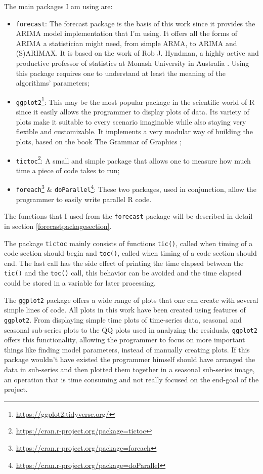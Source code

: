 \documentclass[12pt,a4paper,titlepage]{report}
\begin{document}
The main packages I am using are: 
\begin{itemize}
    \item \texttt{forecast}: The forecast package is the basis of this work since it provides the ARIMA model implementation that I'm using. It offers all the forms of ARIMA a statistician might need, from simple ARMA, to ARIMA and (S)ARIMAX. It is based on the work of Rob J. Hyndman, a highly active and productive professor of statistics at Monash University in Australia \cite{forecastpackagearticle} \cite{forecastpackagemanual}. Using this package requires one to understand at least the meaning of the algorithms' parameters;
    \item \texttt{ggplot2}\footnote{\url{https://ggplot2.tidyverse.org/}}: This may be the most popular package in the scientific world of R since it easily allows the programmer to display plots of data. Its variety of plots make it suitable to every scenario imaginable while also staying very flexible and customizable. It implements a very modular way of building the plots, based on the book The Grammar of Graphics \cite{thegrammarofgraphics};
    \item \texttt{tictoc}\footnote{\url{https://cran.r-project.org/package=tictoc}}: A small and simple package that allows one to measure how much time a piece of code takes to run;
    \item \texttt{foreach}\footnote{\url{https://cran.r-project.org/package=foreach}} \& \texttt{doParallel}\footnote{\url{https://cran.r-project.org/package=doParallel}}: These two packages, used in conjunction, allow the programmer to easily write parallel R code.
\end{itemize}

The functions that I used from the \texttt{forecast} package will be described in detail in section \ref{forecastpackagesection}.

The package \texttt{tictoc} mainly consists of functions \texttt{tic()}, called when timing of a code section should begin and \texttt{toc()}, called when timing of a code section should end. The last call has the side effect of printing the time elapsed between the \texttt{tic()} and the \texttt{toc()} call, this behavior can be avoided and the time elapsed could be stored in a variable for later processing.

The \texttt{ggplot2} package offers a wide range of plots that one can create with several simple lines of code. All plots in this work have been created using features of \texttt{ggplot2}. From displaying simple time plots of time-series data, seasonal and seasonal sub-series plots to the QQ plots used in analyzing the residuals, \texttt{ggplot2} offers this functionality, allowing the programmer to focus on more important things like finding model parameters, instead of manually creating plots. If this package wouldn't have existed the programmer himself should have arranged the data in sub-series and then plotted them together in a seasonal sub-series image, an operation that is time consuming and not really focused on the end-goal of the project.
\end{document}
